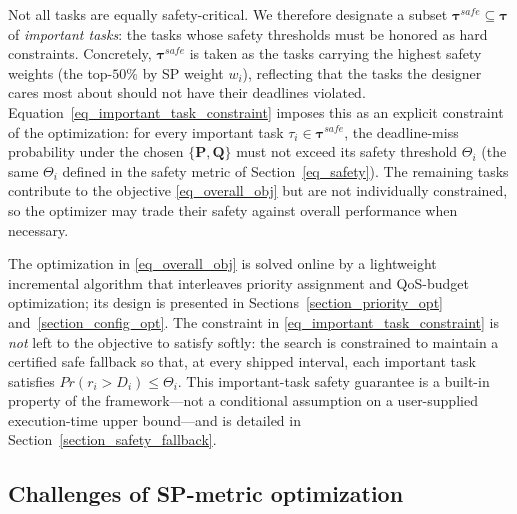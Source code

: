         Not all tasks are equally safety-critical.
        We therefore designate a subset $\boldsymbol{\tau}^{safe} \subseteq \boldsymbol{\tau}$ of \emph{important tasks}: the tasks whose safety thresholds must be honored as hard constraints.
        Concretely, $\boldsymbol{\tau}^{safe}$ is taken as the tasks carrying the highest safety weights (the top-$50\%$ by SP weight $w_i$), reflecting that the tasks the designer cares most about should not have their deadlines violated.
        Equation~\eqref{eq_important_task_constraint} imposes this as an explicit constraint of the optimization: for every important task $\tau_i \in \boldsymbol{\tau}^{safe}$, the deadline-miss probability under the chosen $\{\boldsymbol{P}, \boldsymbol{Q}\}$ must not exceed its safety threshold $\Theta_i$ (the same $\Theta_i$ defined in the safety metric of Section~\ref{eq_safety}).
        The remaining tasks contribute to the objective \eqref{eq_overall_obj} but are not individually constrained, so the optimizer may trade their safety against overall performance when necessary.

        The optimization in \eqref{eq_overall_obj} is solved online by a lightweight incremental algorithm that interleaves priority assignment and QoS-budget optimization; its design is presented in Sections~\ref{section_priority_opt} and~\ref{section_config_opt}.
        The constraint in \eqref{eq_important_task_constraint} is \emph{not} left to the objective to satisfy softly: the search is constrained to maintain a certified safe fallback so that, at every shipped interval, each important task satisfies $Pr(r_i > D_i) \leq \Theta_i$.
        This important-task safety guarantee is a built-in property of the framework---not a conditional assumption on a user-supplied execution-time upper bound---and is detailed in Section~\ref{section_safety_fallback}.





	\subsection{Challenges of SP-metric optimization}

